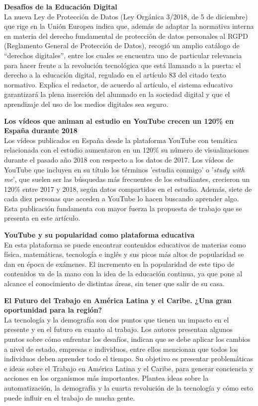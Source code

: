 \documentclass[runningheads]{llncs}
\begin{document}
\textbf{Desafíos de la Educación Digital}\\
La nueva Ley de Protección de Datos (Ley Orgánica 3/2018, de 5 de diciembre) que rige en la Unión Europea indica que, además de adaptar la normativa interna en materia del derecho fundamental de protección de datos personales al RGPD (Reglamento General de Protección de Datos), recogió un amplio catálogo de “derechos digitales”, entre los cuales se encuentra uno de particular relevancia para hacer frente a la revolución tecnológica que está llamando a la puerta: el derecho a la educación digital, regulado en el artículo 83 del citado texto normativo. Explica el redactor, de acuerdo al artículo, el sistema educativo garantizará la plena inserción del alumnado en la sociedad digital y que el aprendizaje del uso de los medios digitales sea seguro.\cite{6}

\textbf{Los vídeos que animan al estudio en YouTube crecen un 120\% en España durante 2018}\\
Los vídeos publicados en España desde la plataforma YouTube con temática relacionada con el estudio aumentaron en un 120\% su número de visualizaciones durante el pasado año 2018 con respecto a los datos de 2017. Los vídeos de YouTube que incluyen en su título los términos 'estudia conmigo' o '\textit{study with me}', que suelen ser las búsquedas más frecuentes de los estudiantes, crecieron un 120\% entre 2017 y 2018, según datos compartidos en el estudio. Además, siete de cada diez personas que acceden a YouTube lo hacen buscando aprender algo.\cite{7} Esta publicación fundamenta con mayor fuerza la propuesta de trabajo que se presenta en este artículo.

\textbf{YouTube y su popularidad como plataforma educativa}\\
En esta plataforma se puede encontrar contenidos educativos de materias como física, matemáticas, tecnología e inglés y sus picos más altos de popularidad se dan en época de exámenes. El incremento en la popularidad de este tipo de contenidos va de la mano con la idea de la educación continua, ya que pone al alcance el conocimiento de distintas áreas, sin tener que salir de su casa.\cite{8}


\textbf{{El Futuro del Trabajo en América Latina y el Caribe. ¿Una gran oportunidad para la región?}} \\
La tecnología y la demografía son dos puntos que tienen un impacto en el presente y en el futuro en cuanto al trabajo. Los autores presentan algunos puntos sobre cómo enfrentar los desafíos, indican que se debe aplicar los cambios a nivel de estado, empresas e individuos, entre ellos mencionan que todos los individuos deben aprender todo el tiempo. Su objetivo es presentar problemáticas e ideas sobre el Trabajo en América Latina y el Caribe, para generar conciencia y acciones en los organismos más importantes. Plantea ideas sobre la automatización, la demografía y la cuarta revolución de la tecnología y cómo esto puede influir en el trabajo de mucha gente.\cite{3}
\end{document}
